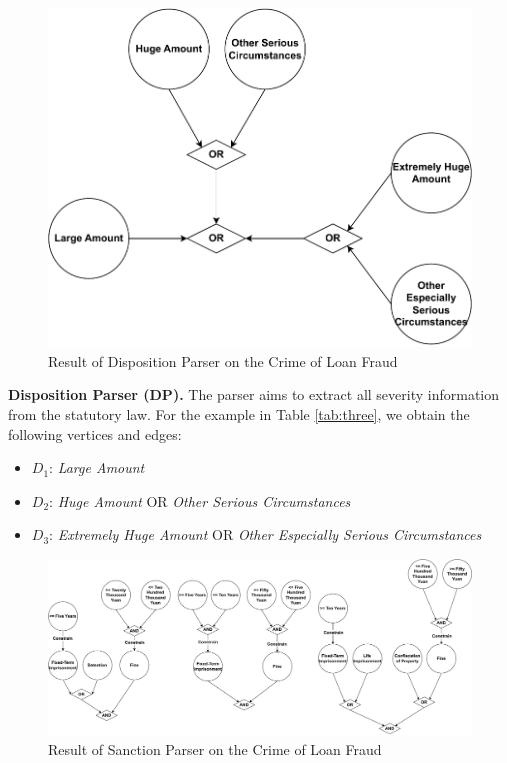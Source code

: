 \begin{figure}[H]
    \centering
    \includegraphics[width=1\linewidth]{figs/DP-Result.pdf}
    \caption{Result of Disposition Parser on the Crime of Loan Fraud}
    \label{fig:DP-Result}
\end{figure}

\textbf{Disposition Parser (DP).} 
The parser aims to extract all severity information from the statutory law. For the example in Table \ref{tab:three}, we obtain the following vertices and edges:

\begin{itemize}
    \item $D_1$: \textit{Large Amount}
    \item $D_2$: \textit{Huge Amount} OR \textit{Other Serious Circumstances}
    \item $D_3$: \textit{Extremely Huge Amount} OR \textit{Other Especially Serious Circumstances}
\end{itemize}


\begin{figure}[H]
    \centering
    \includegraphics[width=1\linewidth]{figs/SP-Result.pdf}
    \caption{Result of Sanction Parser on the Crime of Loan Fraud}
    \label{fig:SP-Result}
\end{figure}

